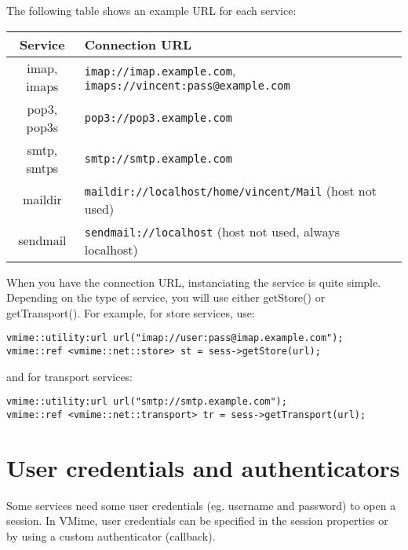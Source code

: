 
The following table shows an example URL for each service:

\noindent\begin{tabularx}{1.0\textwidth}{|c|X|}
\hline
	{\bf Service} &
	{\bf Connection URL} \\
\hline
imap, imaps & {\tt imap://imap.example.com},
{\tt imaps://vincent:pass@example.com} \\
\hline
pop3, pop3s & {\tt pop3://pop3.example.com} \\
\hline
smtp, smtps & {\tt smtp://smtp.example.com} \\
\hline
maildir & {\tt maildir://localhost/home/vincent/Mail} (host not used) \\
\hline
sendmail & {\tt sendmail://localhost} (host not used, always localhost) \\
\hline
\end{tabularx}

\newpage

When you have the connection URL, instanciating the service is quite simple.
Depending on the type of service, you will use either {\vcode getStore()} or
{\vcode getTransport()}. For example, for store services, use:

\begin{lstlisting}
vmime::utility:url url("imap://user:pass@imap.example.com");
vmime::ref <vmime::net::store> st = sess->getStore(url);
\end{lstlisting}

and for transport services:

\begin{lstlisting}
vmime::utility:url url("smtp://smtp.example.com");
vmime::ref <vmime::net::transport> tr = sess->getTransport(url);
\end{lstlisting}


\section{User credentials and authenticators}

Some services need some user credentials (eg. username and password) to open
a session. In VMime, user credentials can be specified in the session
properties or by using a custom authenticator (callback).

